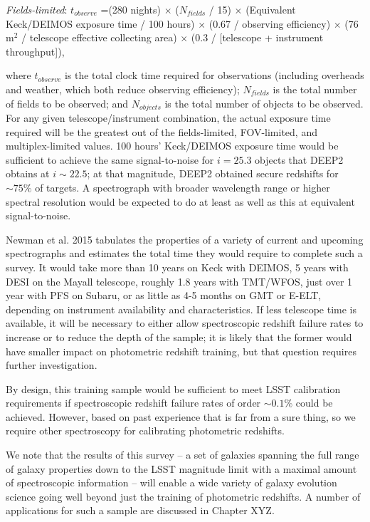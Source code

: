 {\it Fields-limited}:  $t_{observe}$ =(280 nights) $\times$ ($N_{fields}$ / 15) $\times$ (Equivalent Keck/DEIMOS exposure time / 100 hours) $\times$ (0.67 / observing efficiency) $\times$ (76 m$^2$  / telescope effective collecting area) $\times$ (0.3 / [telescope + instrument throughput]), 

where $t_{observe}$ is the total clock time required for observations (including overheads and weather, which both reduce observing efficiency); $N_{fields}$ is the total number of fields to be observed; and $N_{objects}$ is the total number of objects to be observed.   For any given telescope/instrument combination, the actual exposure time required will be the greatest out of the fields-limited, FOV-limited, and multiplex-limited values.  100 hours' Keck/DEIMOS exposure time would be sufficient to achieve the same signal-to-noise for $i=25.3$ objects that DEEP2 obtains at $i \sim 22.5$; at that magnitude, DEEP2 obtained secure redshifts for $\sim 75\%$ of targets.  A spectrograph with broader wavelength range or higher spectral resolution would be expected to do at least as well as this at equivalent signal-to-noise.

Newman et al. 2015 tabulates the properties of a variety of current and upcoming spectrographs and estimates the total time they would require to complete such a survey.  It would take more than 10 years on Keck with DEIMOS, 5 years with DESI on the Mayall telescope, roughly 1.8 years with TMT/WFOS, just over 1 year with PFS on Subaru, or as little as 4-5 months on GMT or E-ELT, depending on instrument availability and characteristics.  If less telescope time is available, it will be necessary to either allow spectroscopic redshift failure rates to increase or to reduce the depth of the sample; it is likely that the former would have smaller impact on photometric redshift training, but that question requires further investigation.

By design, this training sample would be sufficient to meet LSST calibration requirements if spectroscopic redshift failure rates of order $\sim 0.1\%$ could be achieved.  However, based on past experience that is far from a sure thing, so we require other spectroscopy for calibrating photometric redshifts.  

We note that the results of this survey -- a set of galaxies spanning the full range of galaxy properties down to the LSST magnitude limit with a maximal amount of spectroscopic information -- will enable a wide variety of galaxy evolution science going well beyond just the training of photometric redshifts.  A number of applications for such a sample are discussed in Chapter XYZ.

